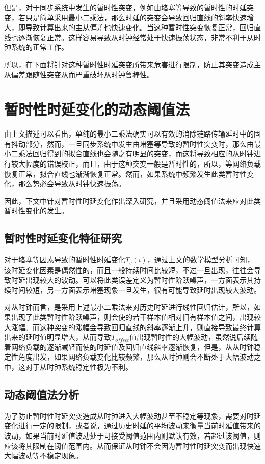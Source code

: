 但是，对于同步系统中发生的暂时性突变，例如由堵塞等导致的暂时性的时延突变，若只是简单采用最小二乘法，那么时延的突变会导致回归直线的斜率快速增大，即导致计算出来的主从偏差也快速变化。当这种暂时性突变恢复正常，回归直线也逐渐恢复正常。这样容易导致从时钟经常处于快速振荡状态，非常不利于从时钟系统的正常工作。

所以，在下面将针对这种暂时性时延突变所带来危害进行限制，防止其突变造成主从偏差跟随性突变从而严重破坏从时钟鲁棒性。

\section{暂时性时延变化的动态阈值法}
由上文描述可以看出，单纯的最小二乘法确实可以有效的消除链路传输延时中的固有抖动部分，然而，一旦同步系统中发生由堵塞等导致的暂时性突变时，那么由最小二乘法回归得到的拟合直线也会随之有明显的突变，而这将导致相应的从时钟进行较大幅度的错误校正，而且，由于这种突变一般是暂时性的，所以，等网络负载恢复正常，拟合直线也渐渐恢复正常。然而，如果系统中频繁发生此类暂时性变化，那么势必会导致从时钟快速振荡。

因此，下文中针对暂时性时延变化作出深入研究，并且采用动态阈值法来应对此类暂时性变化的发生。

\subsection{暂时性时延变化特征研究}
对于堵塞等因素导致的暂时性时延变化$T_{q}(i)$，通过上文的数学模型分析可知，该时延变化因素是偶然性的，而且一般持续时间比较短，不过一旦出现，往往会导致时延出现较大的波动。可以将此类误差定义为暂时性阶跃噪声，一方面表示其持续时间较短，另一方面表示堵塞现象一旦发生，很有可能导致延时出现较大波动。

对从时钟而言，是采用上述最小二乘法来对历史时延进行线性回归估计，所以，如果出现了此类暂时性阶跃噪声，则会使的若干样本值相对旧有样本值之间，出现较大涨幅。而这种突变的涨幅会导致回归直线的斜率逐渐上升，则直接导致最终计算出来的延时值明显增大，从而导致$T_{offset}$值出现暂时性的大幅波动，虽然说后续随着网络负载的逐渐减轻而使的时延值及回归直线斜率逐渐恢复，但是，从从时钟稳定性角度出发，如果网络负载变化比较频繁，那么从时钟则会不断处于大幅波动之中，这对于从时钟系统稳定性极为不利。

\subsection{动态阈值法分析}
为了防止暂时性时延突变造成从时钟进入大幅波动甚至不稳定等现象，需要对时延变化进行一定的限制，或者说，通过历史时延的平均波动来衡量当前时延值带来的波动，如果当前时延值波动处于可接受阈值范围内则默认有效，若超过该阈值，则应该将其限制在阈值范围内。从而保证从时钟不会因为暂时性时延突变而出现快速大幅波动等不稳定现象。

